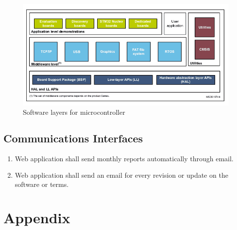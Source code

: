 \documentclass{scrreprt}
\begin{document}
\begin{figure}[H]
 \begin{center}
	\includegraphics[scale=0.5]{cube}
  	\caption{Software layers for microcontroller}
  \end{center}
\end{figure}


\section{Communications Interfaces}
\begin{enumerate}[leftmargin=5\parindent, label=UI-\arabic*:]
  \item Web application shall send monthly reports automatically through email.
  \item Web application shall send an email for every revision or update on the software or terms.
\end{enumerate}

\chapter{Appendix}
\end{document}
